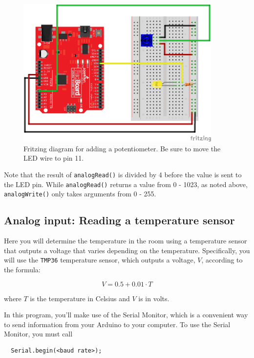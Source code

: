 \documentclass[11pt]{article} %
\begin{document}
\begin{figure}[hbt]
\begin{center}
\includegraphics[width=4in]{figures/potentiometer_fritz.png}
\caption{Fritzing diagram for adding a potentiometer. Be sure to move the LED wire to pin 11.}
\label{fig:pot}
\end{center}
\end{figure}

Note that the result of \verb|analogRead()| is divided by 4 before the value is sent to the LED pin. While \verb|analogRead()| returns a value from 0 - 1023, as noted above, \verb|analogWrite()| only takes arguments from 0 - 255.

\subsection*{Analog input: Reading a temperature sensor}

Here you will determine the temperature in the room using a temperature sensor that outputs a voltage that varies depending on the temperature. Specifically, you will use the \verb|TMP36| temperature sensor, which outputs a voltage, $V$, according to the formula:

\begin{equation}
  V = 0.5 + 0.01 \cdot T
\end{equation}

where $T$ is the temperature in Celsius and $V$ is in volts.

In this program, you’ll make use of the Serial Monitor, which is a convenient way to send information from your Arduino to your computer. To use the Serial Monitor, you must call

\begin{verbatim}
  Serial.begin(<baud rate>);
\end{verbatim}
\end{document}
